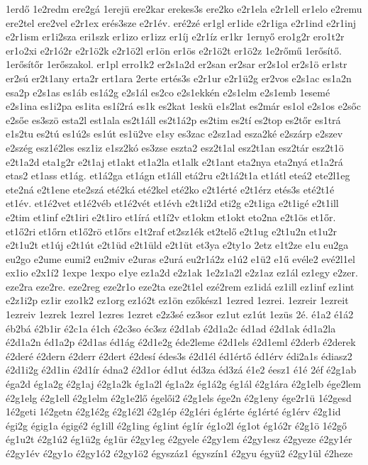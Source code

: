 {1erdő
1e2redm
ere2gá
1erejü
ere2kar
erekes3s
ere2ko
e2r1ela
e2r1ell
er1elo
e2remu
ere2tel
ere2vel
e2r1ex
erés3sze
e2r1év.
eré2zé
er1gl
er1ide
e2r1iga
e2r1ind
e2r1inj
e2r1ism
er1i2sza
eri1szk
er1izo
er1izz
er1íj
e2r1íz
er1kr
1ernyő
ero1g2r
ero1t2r
er1o2xi
e2r1ó2r
e2r1ö2k
e2r1ö2l
er1ön
er1ös
e2r1ö2t
er1ö2z
1e2rőmű
1erősítő.
1erősítőr
1erőszakol.
er1pl
erro1k2
er2s1a2d
er2san
er2sar
er2s1ol
er2s1ö
er1str
er2sú
er2t1any
erta2r
ert1ara
2erte
ertés3s
e2r1ur
e2r1ü2g
er2vos
e2s1ac
es1a2n
esa2p
e2s1as
es1áb
es1á2g
e2s1ál
es2co
e2s1ekkén
e2s1elm
e2s1emb
1esemé
e2s1ina
es1i2pa
es1ita
es1í2rá
es1k
es2kat
1eskü
e1s2lat
es2már
es1ol
e2s1os
e2sőc
e2sőe
es3szö
esta2l
est1ala
es2t1áll
es2t1á2p
es2tim
es2tí
es2top
es2tőr
es1trá
e1s2tu
es2tú
es1ú2s
es1út
es1ü2ve
e1sy
es3zac
e2sz1ad
esza2ké
e2szárp
e2szev
e2szég
esz1é2les
esz1iz
e1sz2kó
es3zse
eszta2
esz2t1al
esz2t1an
esz2tár
esz2t1ö
e2t1a2d
eta1g2r
e2t1aj
et1akt
et1a2la
et1alk
e2t1ant
eta2nya
eta2nyá
et1a2rá
etas2
et1ass
et1ág.
et1á2ga
et1ágn
et1áll
etá2ru
e2t1á2t1a
et1átl
eteá2
ete2l1eg
ete2ná
e2t1ene
ete2szá
eté2ká
eté2kel
eté2ko
e2t1érté
e2t1érz
etés3s
eté2t1é
et1év.
et1é2vet
et1é2véb
et1é2vét
et1évh
e2t1i2d
eti2g
e2t1iga
e2t1igé
e2t1ill
e2tim
et1inf
e2t1iri
e2t1iro
et1írá
et1í2v
et1okm
et1okt
eto2na
e2t1ös
et1őr.
et1ő2ri
et1őrn
et1ő2rö
et1őrs
e1t2raf
et2sz1ék
et2telő
e2t1ug
e2t1u2n
et1u2r
e2t1u2t
et1új
e2t1út
e2t1üd
e2t1üld
e2t1üt
et3ya
e2ty1o
2etz
e1t2ze
e1u
eu2ga
eu2go
e2ume
eumi2
eu2miv
e2uras
e2urá
eu2r1á2z
e1ú2
e1ü2
e1ű
evéle2
evé2l1el
ex1io
e2x1í2
1expe
1expo
e1ye
ez1a2d
e2z1ak
1e2z1a2l
e2z1az
ez1ál
ez1egy
e2zer.
eze2ra
eze2re.
eze2reg
eze2r1o
eze2ta
eze2t1el
ezé2rem
ez1idá
ez1ill
ez1inf
ez1int
e2z1i2p
ez1ir
ezo1k2
ez1org
ez1ó2t
ez1ön
ezőkész1
1ezred
1ezrei.
1ezreir
1ezreit
1ezreiv
1ezrek
1ezrel
1ezres
1ezret
e2z3sé
ez3sor
ez1ut
ez1út
1ezüs
2é.
é1a2
é1á2
éb2bá
é2b1ir
é2c1a
é1ch
é2c3so
éc3sz
é2d1ab
é2d1a2c
éd1ad
é2d1ak
éd1a2la
é2d1a2n
éd1a2p
é2d1as
éd1ág
é2d1e2g
éde2leme
é2d1els
é2d1eml
é2derb
é2derek
é2deré
é2dern
é2derr
é2dert
é2desí
édes3s
é2d1él
éd1értő
éd1érv
édi2a1s
édiasz2
é2d1i2g
é2d1in
é2d1ír
édna2
é2d1or
éd1ut
éd3za
éd3zá
é1e2
éesz1
é1é
2éf
é2g1ab
éga2d
ég1a2g
é2g1aj
é2g1a2k
ég1a2l
ég1a2z
ég1á2g
ég1ál
é2g1ára
é2g1elb
ége2lem
é2g1elg
é2g1ell
é2g1elm
é2g1e2lő
égelői2
é2g1els
ége2n
é2g1eny
ége2r1ü
1é2gesd
1é2geti
1é2getn
é2g1é2g
é2g1é2l
é2g1ép
é2g1éri
ég1érte
ég1érté
ég1érv
é2g1id
égi2g
égig1a
égigé2
ég1ill
é2g1ing
ég1int
ég1ír
ég1o2l
ég1ot
ég1ó2r
é2g1ö
1é2gő
ég1u2t
é2g1ú2
ég1ü2g
ég1ür
é2gy1eg
é2gyele
é2gy1em
é2gy1esz
é2gyeze
é2gy1ér
é2gy1év
é2gy1o
é2gy1ó2
é2gy1ö2
égyszáz1
égyszín1
é2gyu
égyü2
é2gy1ül
é2heze
}
